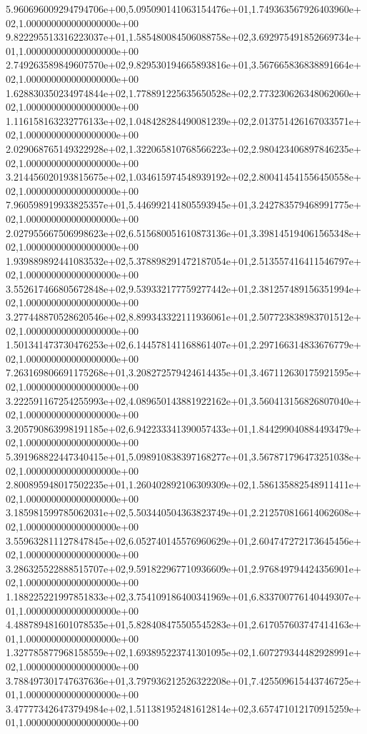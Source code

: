 5.960696009294794706e+00,5.095090141063154476e+01,1.749363567926403960e+02,1.000000000000000000e+00
9.822295513316223037e+01,1.585480084506088758e+02,3.692975491852669734e+01,1.000000000000000000e+00
2.749263589849607570e+02,9.829530194665893816e+01,3.567665836838891664e+02,1.000000000000000000e+00
1.628830350234974844e+02,1.778891225635650528e+02,2.773230626348062060e+02,1.000000000000000000e+00
1.116158163232776133e+02,1.048428284490081239e+02,2.013751426167033571e+02,1.000000000000000000e+00
2.029068765149322928e+02,1.322065810768566223e+02,2.980423406897846235e+02,1.000000000000000000e+00
3.214456020193815675e+02,1.034615974548939192e+02,2.800414541556450558e+02,1.000000000000000000e+00
7.960598919933825357e+01,5.446992141805593945e+01,3.242783579468991775e+02,1.000000000000000000e+00
2.027955667506998623e+02,6.515680051610873136e+01,3.398145194061565348e+02,1.000000000000000000e+00
1.939889892441083532e+02,5.378898291472187054e+01,2.513557416411546797e+02,1.000000000000000000e+00
3.552617466805672848e+02,9.539332177759277442e+01,2.381257489156351994e+02,1.000000000000000000e+00
3.277448870528620546e+02,8.899343322111936061e+01,2.507723838983701512e+02,1.000000000000000000e+00
1.501341473730476253e+02,6.144578141168861407e+01,2.297166314833676779e+02,1.000000000000000000e+00
7.263169806691175268e+01,3.208272579424614435e+01,3.467112630175921595e+02,1.000000000000000000e+00
3.222591167254255993e+02,4.089650143881922162e+01,3.560413156826807040e+02,1.000000000000000000e+00
3.205790863998191185e+02,6.942233341390057433e+01,1.844299040884493479e+02,1.000000000000000000e+00
5.391968822447340415e+01,5.098910838397168277e+01,3.567871796473251038e+02,1.000000000000000000e+00
2.800895948017502235e+01,1.260402892106309309e+02,1.586135882548911411e+02,1.000000000000000000e+00
3.185981599785062031e+02,5.503440504363823749e+01,2.212570816614062608e+02,1.000000000000000000e+00
3.559632811127847845e+02,6.052740145576960629e+01,2.604747272173645456e+02,1.000000000000000000e+00
3.286325522888515707e+02,9.591822967710936609e+01,2.976849794424356901e+02,1.000000000000000000e+00
1.188225221997851833e+02,3.754109186400341969e+01,6.833700776140449307e+01,1.000000000000000000e+00
4.488789481601078535e+01,5.828408475505545283e+01,2.617057603747414163e+01,1.000000000000000000e+00
1.327785877968158559e+02,1.693895223741301095e+02,1.607279344482928991e+02,1.000000000000000000e+00
3.788497301747637636e+01,3.797936212526322208e+01,7.425509615443746725e+01,1.000000000000000000e+00
3.477773426473794984e+02,1.511381952481612814e+02,3.657471012170915259e+01,1.000000000000000000e+00
